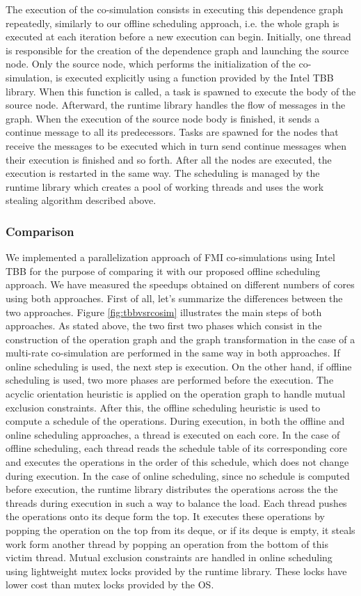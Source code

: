 The execution of the co-simulation consists in executing this dependence graph repeatedly, similarly to our offline scheduling approach, i.e. the whole graph is executed at each iteration before a new execution can begin. Initially, one thread is responsible for the creation of the dependence graph and launching the source node. Only the source node, which performs the initialization of the co-simulation, is executed explicitly using a function provided by the Intel TBB library. When this function is called, a task is spawned to execute the body of the source node. Afterward, the runtime library handles the flow of messages in the graph. When the execution of the source node body is finished, it sends a continue message to all its predecessors. Tasks are spawned for the nodes that receive the messages to be executed which in turn send continue messages when their execution is finished and so forth. After all the nodes are executed, the execution is restarted in the same way. The scheduling is managed by the runtime library which creates a pool of working threads and uses the work stealing algorithm described above.

\subsubsection{Comparison}

We implemented a parallelization approach of FMI co-simulations using Intel TBB for the purpose of comparing it with our proposed offline scheduling approach. We have measured the speedups obtained on different numbers of cores using both approaches. First of all, let's summarize the differences between the two approaches. Figure \ref{fig:tbbvsrcosim} illustrates the main steps of both approaches. As stated above, the two first two phases which consist in the construction of the operation graph and the graph transformation in the case of a multi-rate co-simulation are performed in the same way in both approaches. If online scheduling is used, the next step is execution. On the other hand, if offline scheduling is used, two more phases are performed before the execution. The acyclic orientation heuristic is applied on the operation graph to handle mutual exclusion constraints. After this, the offline scheduling heuristic is used to compute a schedule of the operations. During execution, in both the offline and online scheduling approaches, a thread is executed on each core. In the case of offline scheduling, each thread reads the schedule table of its corresponding core and executes the operations in the order of this schedule, which does not change during execution. In the case of online scheduling, since no schedule is computed before execution, the runtime library distributes the operations across the the threads during execution in such a way to balance the load. Each thread pushes the operations onto its deque form the top. It executes these operations by popping the operation on the top from its deque, or if its deque is empty, it steals work form another thread by popping an operation from the bottom of this victim thread. Mutual exclusion constraints are handled in online scheduling using lightweight mutex locks provided by the runtime library. These locks have lower cost than mutex locks provided by the OS. 

